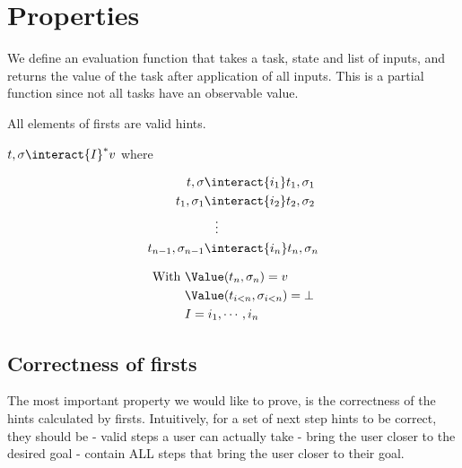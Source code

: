 
\section{Properties}
\label{sec:properties}

We define an evaluation function that takes a task, state and list of inputs,
and returns the value of the task after application of all inputs.
This is a partial function since not all tasks have an observable value.

All elements of firsts are valid hints.

\begin{definition}[Evaluate]
  $t,\sigma\interact{I}^* v$ where

  \begin{minipage}[c]{0.4\textwidth}
    \begin{align*}
      t,\sigma             & \interact{i_1}  t_1,\sigma_1\\
      t_1,\sigma_1         & \interact{i_2}  t_2,\sigma_2\\
                           & \hspace{3mm}\vdots    \\
      t_{n-1},\sigma_{n-1} & \interact{i_n}  t_n,\sigma_n
    \end{align*}
\end{minipage}
\begin{minipage}[c]{0.1\textwidth}
  \Quad
\end{minipage}
\begin{minipage}[c]{0.3\textwidth}
  \begin{align*}
  \text{With }&\Value(t_n,\sigma_n)=v\\
  &\Value(t_{i<n},\sigma_{i<n})=\bot\\
  &I=i_1,\cdots,i_n
\end{align*}
\end{minipage}





\end{definition}

\subsection{Correctness of firsts}

The most important property we would like to prove, is the correctness of the hints calculated by firsts.
Intuitively, for a set of next step hints to be correct, they should be
- valid steps a user can actually take
- bring the user closer to the desired goal
- contain ALL steps that bring the user closer to their goal.

